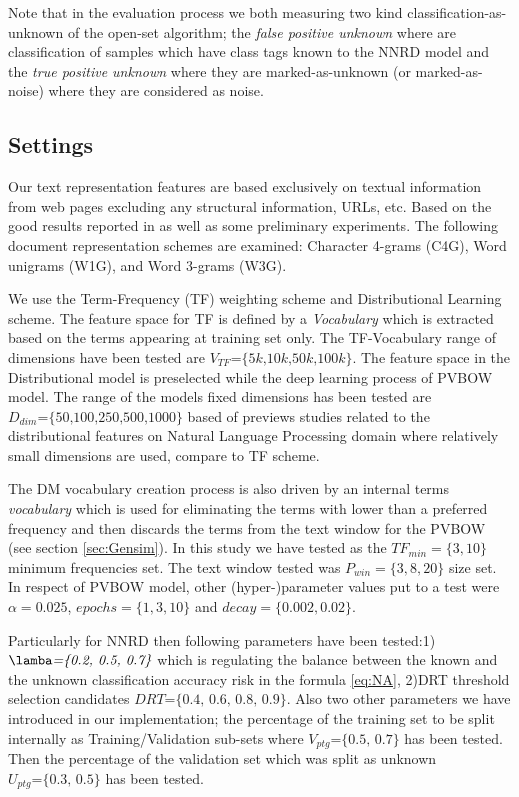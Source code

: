 \documentclass[runningheads]{llncs}
\begin{document}
Note that in the evaluation process we both measuring two kind classification-as-unknown of the open-set algorithm; the \textit{false positive unknown} where are classification of samples which have class tags known to the NNRD model and the \textit{true positive unknown} where they are marked-as-unknown (or marked-as-noise) where they are considered as noise.

\subsection{Settings}\label{sec:evaluation_measures}
Our text representation features are based exclusively on textual information from web pages excluding any structural information, URLs, etc. Based on the good results reported in \citep{sharoff2010web,pritsos2013open,Asheghi2015} as well as some preliminary experiments. The following document representation schemes are examined: Character 4-grams (C4G), Word unigrams (W1G), and Word 3-grams (W3G).

We use the Term-Frequency (TF) weighting scheme and Distributional Learning scheme. The feature space for TF is defined by a \textit{Vocabulary} which is extracted based on the terms appearing at training set only. The TF-Vocabulary range of dimensions have been tested are $V_{TF}\textit{=\{5k,10k,50k,100k\}}$. The feature space in the Distributional model is preselected while the deep learning process of PVBOW model. The range of the models fixed dimensions has been tested are $D_{dim}\textit{=\{50,100,250,500,1000\}}$ based of previews studies related to the distributional features on Natural Language Processing domain where relatively small dimensions are used, compare to TF scheme.

The DM vocabulary creation process is also driven by an internal terms \textit{vocabulary} which is used for eliminating the terms with lower than a preferred frequency and then discards the terms from the text window for the PVBOW (see section \ref{sec:Gensim}). In this study we have tested as the $TF_{min}=\{3,10\}$ minimum frequencies set. The text window tested was $P_{win}=\{3,8,20\}$ size set. In respect of PVBOW model, other (hyper-)parameter values put to a test were $\alpha=0.025$, $epochs=\{1, 3, 10\}$ and $decay=\{0.002, 0.02\}$.

Particularly for NNRD then following parameters have been tested:1) $\lamba\textit{=\{0.2, 0.5, 0.7\}}$ which is regulating the balance between the known and the unknown classification accuracy risk in the formula \ref{eq:NA}, 2)DRT threshold selection candidates $DRT\textit{=\{0.4, 0.6, 0.8, 0.9\}}$. Also two other parameters we have introduced in our implementation; the percentage of the training set to be split internally as Training/Validation sub-sets where $V_{ptg}\textit{=\{0.5, 0.7\}}$ has been tested. Then the percentage of the validation set which was split as unknown $U_{ptg}\textit{=\{0.3, 0.5\}}$ has been tested.
\end{document}
